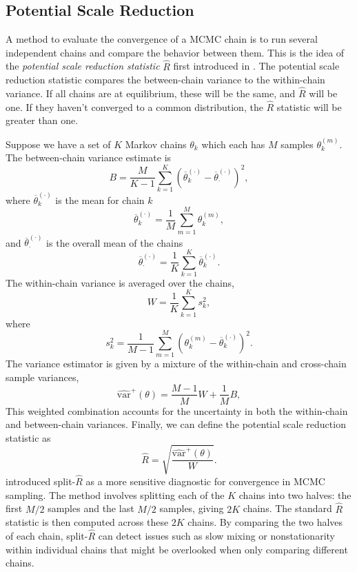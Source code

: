\subsection*{Potential Scale Reduction}
A method to evaluate the convergence of a \gls*{MCMC} chain is to run several independent chains and compare the behavior between them. This is the idea of the \emph{potential scale reduction statistic} $\widehat{R}$ first introduced in \cite{Rubin}. The potential scale reduction statistic compares the between-chain variance to the within-chain variance. If all chains are at equilibrium, these will be the same, and \(\widehat{R}\) will be one. If they haven't converged to a common distribution, the \(\widehat{R}\) statistic will be greater than one.

Suppose we have a set of $K$ Markov chains $\theta_k$ which each has $M$ samples $\theta_k^{(m)}$. The between-chain variance estimate is
\[
	B=\frac{M}{K-1}\sum_{k=1}^{K}(\overline{\theta}_k^{(\boldsymbol\cdot)}-\overline{\theta}_{\boldsymbol\cdot}^{(\boldsymbol\cdot)})^2,
\]
where $\overline{\theta}_k^{(\boldsymbol\cdot)}$ is the mean for chain $k$
\[
	\overline{\theta}_k^{(\boldsymbol\cdot)}=\frac{1}{M} \sum_{m=1}^M\theta_k^{(m)},
\]
and $\overline{\theta}_{\boldsymbol\cdot}^{(\boldsymbol\cdot)}$ is the overall mean of the chains
\[
	\overline{\theta}_{\boldsymbol\cdot}^{(\boldsymbol\cdot)}=\frac{1}{K}\sum_{k=1}^K \overline{\theta}_k^{(\boldsymbol\cdot)}.
\]
The within-chain variance is averaged over the chains,
\[
	W=\frac{1}{K}\sum_{k=1}^K s_k^2,
\]
where 
\[
	s_k^2=\frac{1}{M-1}\sum_{m=1}^M (\theta_k^{(m)}-\overline{\theta}_k^{(\boldsymbol\cdot)})^2.
\]
The variance estimator is given by a mixture of the within-chain and cross-chain sample variances,
\begin{equation}
	\widehat{\text{var}}^+(\theta)=\frac{M-1}{M}W+\frac{1}{M}B,
	\label{eq:var_est_rhat}
\end{equation}
This weighted combination accounts for the uncertainty in both the within-chain and between-chain variances. Finally, we can define the potential scale reduction statistic as
\[
	\widehat{R}=\sqrt{\frac{\widehat{\text{var}}^+(\theta)}{W}}.
\]
\cite{gelman2013bayesian} introduced split-$\widehat{R}$ as a more sensitive diagnostic for convergence in \gls*{MCMC} sampling. The method involves splitting each of the $K$ chains into two halves: the first $M/2$ samples and the last $M/2$ samples, giving $2K$ chains. The standard $\widehat{R}$ statistic is then computed across these $2K$ chains. By comparing the two halves of each chain, split-$\widehat{R}$ can detect issues such as slow mixing or nonstationarity within individual chains that might be overlooked when only comparing different chains.

